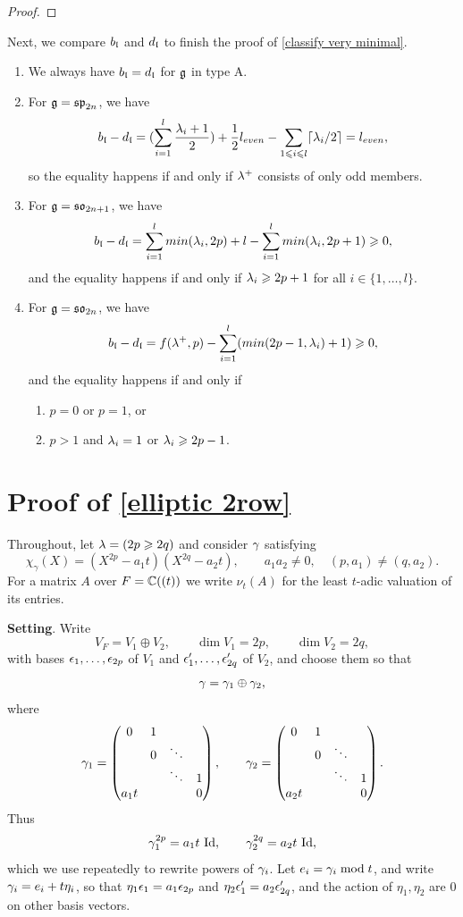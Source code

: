 \documentclass[11pt]{article}
\numberwithin{equation}{section}
\begin{document}
\begin{appendix}
\begin{proof}
\end{proof}
Next, we compare $b_{\mathfrak{l}}$ and $d_{\mathfrak{l}}$ to finish the proof of \cref{classify very minimal}. 
\begin{enumerate}
    \item We always have $b_{\mathfrak{l}}= d_{\mathfrak{l}}$ for $\mathfrak{g}$ in type A.
    \item For $\mathfrak{g}=\mathfrak{sp}_{2n}$, we have 
$$b_{\mathfrak{l}}-d_{\mathfrak{l}}= (\sum_{i=1}^{l} \frac{\lambda_i+1}{2})+ \frac{1}{2}l_{even}- \sum_{1\leqslant i\leqslant l}\lceil \lambda_i/2\rceil= l_{even},$$
so the equality happens if and only if $\lambda^+$ consists of only odd members.
    \item For $\mathfrak{g}=\mathfrak{so}_{2n+1}$, we have 
    $$b_{\mathfrak{l}}-d_{\mathfrak{l}}= \sum_{i=1}^l min(\lambda_i,2p)+l- \sum_{i=1}^l min(\lambda_i,2p+1)\geqslant 0,$$
    and the equality happens if and only if $\lambda_i\geqslant 2p+1$ for all $i\in \{1,\dots, l\}$.
    \item For $\mathfrak{g}=\mathfrak{so}_{2n}$, we have 
    $$b_{\mathfrak{l}}- d_{\mathfrak{l}}= f(\lambda^+,p)- \sum_{i=1}^l (min(2p-1,\lambda_i)+1)\geqslant 0,$$
    and the equality happens if and only if 
    \begin{enumerate}
        \item $p=0$ or $p=1$, or 
        \item $p>1$ and $\lambda_i=1$ or $\lambda_i\geqslant 2p-1$.
    \end{enumerate}
\end{enumerate}
\section{Proof of \cref{elliptic 2row}}
\label{app:two-blocks}

Throughout, let $\lambda=(2p\geqslant 2q)$ and consider $\gamma$ satisfying
\[
\chi_\gamma(X)=(X^{2p}-a_1t)(X^{2q}-a_2t),\qquad a_1a_2\neq0,\quad(p,a_1)\neq(q,a_2).
\]
For a matrix $A$ over $F=\mathbb{C}((t))$ we write $\nu_t(A)$ for the least $t$-adic valuation
of its entries.

\textbf{Setting}.
Write
\[
V_F=V_1\oplus V_2,\qquad
\dim V_1=2p,\qquad \dim V_2=2q,
\]
with bases $\epsilon_1,\dots,\epsilon_{2p}$ of $V_1$ and $\epsilon'_1,\dots,\epsilon'_{2q}$ of
$V_2$, and choose them so that
\[
\gamma=\gamma_1\oplus\gamma_2,
\]
where
\[
\gamma_1=
\begin{pmatrix}
0 & 1 &        &   \\
  & 0 & \ddots &   \\
  &   & \ddots & 1 \\
a_1t &   &      & 0
\end{pmatrix},
\qquad
\gamma_2=
\begin{pmatrix}
0 & 1 &        &   \\
  & 0 & \ddots &   \\
  &   & \ddots & 1 \\
a_2t &   &      & 0
\end{pmatrix}.
\]
Thus
\[
\gamma_1^{2p}=a_1t\,\operatorname{Id},\qquad
\gamma_2^{2q}=a_2t\,\operatorname{Id},
\]
which we use repeatedly to rewrite powers of $\gamma_i$. Let $e_i=\gamma_i\bmod t$,
and write $\gamma_i=e_i+t\eta_i$, so that $\eta_1\epsilon_1=a_1\epsilon_{2p}$ and
$\eta_2\epsilon'_1=a_2\epsilon'_{2q}$, and the action of $\eta_1,\eta_2$ are $0$ on other basis vectors.


\end{appendix}
\end{document}
